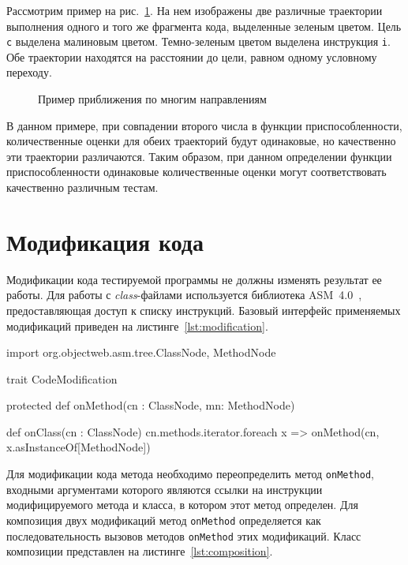 Рассмотрим пример на рис.~\ref{multipathfitness}. На нем изображены две различные траектории выполнения одного и того же фрагмента кода, выделенные зеленым 
цветом. Цель \texttt{c} выделена малиновым цветом. Темно-зеленым цветом выделена инструкция \texttt{i}. Обе траектории находятся на расстоянии до цели, равном 
одному условному переходу.

\begin{figure}[h!]
  \caption{Пример приближения по многим направлениям}
  \label{multipathfitness}
\end{figure}

В данном примере, при совпадении второго числа в функции приспособленности, количественные оценки для обеих траекторий будут одинаковые, но качественно эти 
траектории различаются. Таким образом, при данном определении функции приспособленности одинаковые количественные оценки могут соответствовать качественно 
различным тестам.          

\section{Модификация кода}

Модификации кода тестируемой программы не должны изменять результат ее работы. Для работы с \textit{class}-файлами используется библиотека 
ASM~4.0~\cite{asm_lib}, предоставляющая доступ к списку инструкций. Базовый интерфейс применяемых модификаций приведен на листинге~\ref{lst:modification}.

\begin{snippet}[caption=Типаж модификации кода тестируемой программы, label={lst:modification}]
  import org.objectweb.asm.tree.{ClassNode, MethodNode}

  trait CodeModification {
    protected def onMethod(cn : ClassNode, mn: MethodNode)
  
    def onClass(cn : ClassNode) {
      cn.methods.iterator.foreach{ x =>
	onMethod(cn, x.asInstanceOf[MethodNode])
      }
    }
  }
\end{snippet}

Для модификации кода метода необходимо переопределить метод \texttt{onMethod}, входными аргументами которого являются ссылки на инструкции модифицируемого 
метода и класса, в котором этот метод определен. Для композиция двух модификаций метод \texttt{onMethod} определяется как последовательность вызовов методов 
\texttt{onMethod} этих модификаций. Класс композиции представлен на листинге~\ref{lst:composition}.

